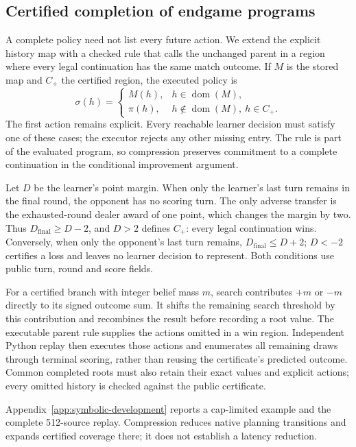 \subsection{Certified completion of endgame programs}
\label{sec:symbolic-tail}
A complete policy need not list every future action. We extend the explicit
history map with a checked rule that calls the unchanged parent in a region
where every legal continuation has the same match outcome. If $M$ is the stored
map and $C_+$ the certified region, the executed policy is
\[
 \sigma(h)=
 \begin{cases}
   M(h), & h\in\operatorname{dom}(M),\\
   \pi(h), & h\notin\operatorname{dom}(M),\ h\in C_+.
 \end{cases}
\]
The first action remains explicit. Every reachable learner decision must satisfy
one of these cases; the executor rejects any other missing entry. The rule is
part of the evaluated program, so compression preserves commitment to a complete
continuation in the conditional improvement argument.

Let $D$ be the learner's point margin. When only the learner's last turn remains
in the final round, the opponent has no scoring turn. The only adverse transfer
is the exhausted-round dealer award of one point, which changes the margin by
two. Thus $D_{\mathrm{final}}\geq D-2$, and $D>2$ defines $C_+$: every legal
continuation wins. Conversely, when only the opponent's last turn remains,
$D_{\mathrm{final}}\leq D+2$; $D<-2$ certifies a loss and leaves no learner
decision to represent. Both conditions use public turn, round and score fields.

For a certified branch with integer belief mass $m$, search contributes $+m$
or $-m$ directly to its signed outcome sum. It shifts the remaining search
threshold by this contribution and recombines the result before recording a
root value. The executable parent rule supplies the actions omitted in a win
region. Independent Python replay then executes those actions and enumerates
all remaining draws through terminal scoring, rather than reusing the
certificate's predicted outcome. Common completed roots must also retain their
exact values and explicit actions; every omitted history is checked against
the public certificate.

Appendix~\ref{app:symbolic-development} reports a cap-limited example and the
complete 512-source replay. Compression reduces native planning transitions
and expands certified coverage there; it does not establish a latency reduction.
